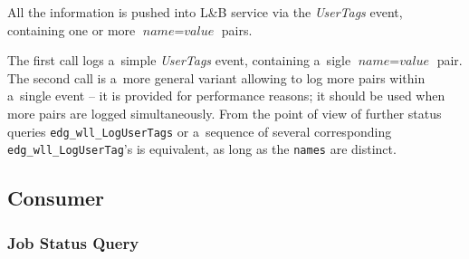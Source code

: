 \documentclass{egee}
\def\LB{L\&B\xspace}
\begin{document}
All the information is pushed into \LB service via the \emph{UserTags} event, 
containing one or more $\textit{name}=\textit{value}$ pairs.

\Synopsis
{}

\iffalse	
\synopsis{edg_wll_LogUserTags}{
edg_wll_Context context &IN& logging context\\
char ** names &IN& names of the tags\\
char ** values & IN& corresponding values of the tags\\
}
\fi

\Description
The first call logs a~simple \emph{UserTags} event,
containing a~sigle  $\textit{name}=\textit{value}$ pair.
The second call is a~more general variant allowing to log more
pairs within a~single event -- it is provided for performance reasons;
it should be used when more pairs are logged simultaneously.
From the point of view of further status queries \verb'edg_wll_LogUserTags' or
a~sequence of several corresponding \verb'edg_wll_LogUserTag''s is equivalent,
as long as the \verb'names' are distinct.


\subsection{Consumer}


\subsubsection{Job Status Query}
\label{s:jobstat}
\Synopsis
{}
\end{document}
